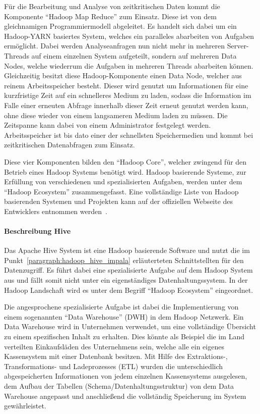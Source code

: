 Für die Bearbeitung und Analyse von zeitkritischen Daten kommt die Komponente
``Hadoop Map Reduce'' zum Einsatz. Diese ist von dem gleichnamigen
Programmiermodell abgeleitet. Es handelt sich dabei um ein Hadoop-YARN
basiertes System, welches ein paralleles abarbeiten von Aufgaben ermöglicht.
Dabei werden Analyseanfragen nun nicht mehr in mehreren Server-Threads auf
einem einzelnen System aufgeteilt, sondern auf mehreren Data Nodes, welche
wiederrum die Aufgaben in mehreren Threads abarbeiten können. Gleichzeitig
besitzt diese Hadoop-Komponente einen Data Node, welcher aus reinem
Arbeitsspeicher besteht. Dieser wird genutzt um Informationen für eine
kurzfristige Zeit auf ein schnelleres Medium zu laden, sodass die
Information im Falle einer erneuten Abfrage innerhalb dieser Zeit erneut
genutzt werden kann, ohne diese wieder von einem langsameren Medium laden
zu müssen. Die Zeitspanne kann dabei von einem Administrator festgelegt werden.
Arbeitsspeicher ist bis dato einer der schnellsten Speichermedien und kommt bei
zeitkritischen Datenabfragen zum Einsatz.

Diese vier Komponenten bilden den ``Hadoop Core'', welcher zwingend für den
Betrieb eines Hadoop Systems benötigt wird. Hadoop basierende Systeme, zur
Erfüllung von verschiedenen und spezialisierten Aufgaben, werden unter dem
``Hadoop Ecosystem'' zusammengefasst. Eine vollständige Liste von Hadoop
basierenden Systemen und Projekten kann auf der offiziellen Webseite des
Entwicklers entnommen werden~\cite{Hadoop_related_projects}.
\nl%

\paragraph{Beschreibung Hive}
\label{paragraph:hadoop_beschreibung}
Das Apache Hive System ist eine Hadoop basierende Software und nutzt die
im Punkt~\ref{paragraph:hadoop_hive_impala} erläuterteten Schnittstellten
für den Datenzugriff. Es führt dabei eine spezialisierte Aufgabe auf dem
Hadoop System aus und fällt somit nicht unter ein eigenständiges
Datenhaltungssystem. In der Hadoop Landschaft wird es unter dem Begriff
``Hadoop Ecosystem'' eingeordnet.

Die angesprochene spezialisierte Aufgabe ist dabei die Implementierung
von einem sogenannten ``Data Warehouse'' (DWH) in dem Hadoop Netzwerk. Ein
Data Warehouse wird in Unternehmen verwendet, um eine vollständige Übersicht
zu einem spezifischen Inhalt zu erhalten. Dies könnte als Beispiel die im
Land verteilten Einkaufsläden des Unternehmens sein, welche alle ein eigenes
Kassensystem mit einer Datenbank besitzen. Mit Hilfe des Extraktions-,
Transformations- und Ladeprozesses (ETL) wurden die unterschiedlich
abgespeicherten Informationen von jedem einzelnen Kassensystems ausgelesen,
dem Aufbau der Tabellen (Schema/Datenhaltungsstruktur) von dem
Data Warehouse angepasst und anschließend die vollständig
Speicherung im System gewährleistet.

